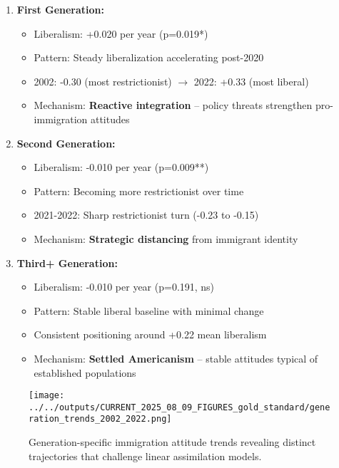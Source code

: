 \documentclass[11pt,letterpaper]{article}
\begin{document}
\begin{enumerate}
    \item \textbf{First Generation:}
        \begin{itemize}
            \item Liberalism: +0.020 per year (p=0.019*)
            \item Pattern: Steady liberalization accelerating post-2020
            \item 2002: -0.30 (most restrictionist) $\rightarrow$ 2022: +0.33 (most liberal)
            \item Mechanism: \textbf{Reactive integration} -- policy threats strengthen pro-immigration attitudes
        \end{itemize}

    \item \textbf{Second Generation:}
        \begin{itemize}
            \item Liberalism: -0.010 per year (p=0.009**)
            \item Pattern: Becoming more restrictionist over time
            \item 2021-2022: Sharp restrictionist turn (-0.23 to -0.15)
            \item Mechanism: \textbf{Strategic distancing} from immigrant identity
        \end{itemize}

    \item \textbf{Third+ Generation:}
        \begin{itemize}
            \item Liberalism: -0.010 per year (p=0.191, ns)
            \item Pattern: Stable liberal baseline with minimal change
            \item Consistent positioning around +0.22 mean liberalism
            \item Mechanism: \textbf{Settled Americanism} -- stable attitudes typical of established populations
        \end{itemize}
\end{enumerate}

\begin{figure}[H]
    \centering
    \texttt{[image: ../../outputs/CURRENT\_2025\_08\_09\_FIGURES\_gold\_standard/generation\_trends\_2002\_2022.png]}
    \caption{Generation-specific immigration attitude trends revealing distinct trajectories that challenge linear assimilation models.}
    \label{fig:generation_trends}
\end{figure}
\end{document}
